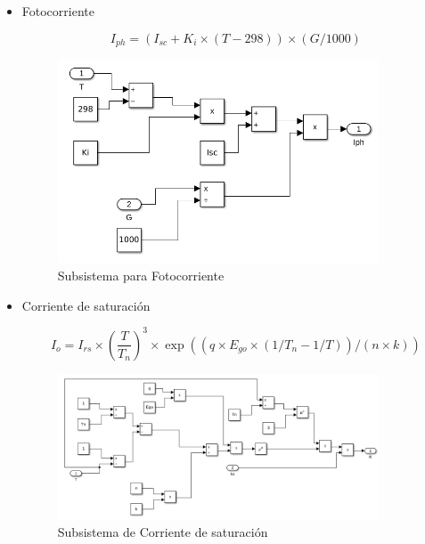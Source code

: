 \documentclass[a4paper,12pt]{article}
\begin{document}
	\begin{itemize}
		\item Fotocorriente
		
			\begin{equation*}
				I_{ph} = \left(I_{sc} + K_i \times \left(T - 298 \right) \right) \times \left(G/1000 \right)
			\end{equation*}
			
			\begin{figure}[htb]
				\centering
				\includegraphics[width=0.9\textwidth]{./imagenes/simulink3.png}
				\caption{Subsistema para Fotocorriente}
			\end{figure} 
		
		\item Corriente de saturación
		
			\begin{equation*}
				I_o = I_{rs} \times \left( \frac{T}{T_n} \right)^3 \times \exp \left( \left( q \times E_{go} \times \left(1/T_n - 1/T \right) \right)/ \left(n \times k \right) \right)
			\end{equation*}
			
			\begin{figure}[htb]
				\centering
				\includegraphics[width=0.9\textwidth]{./imagenes/simulink4.png}
				\caption{Subsistema de Corriente de saturación}
			\end{figure}
		

\end{itemize}
\end{document}
